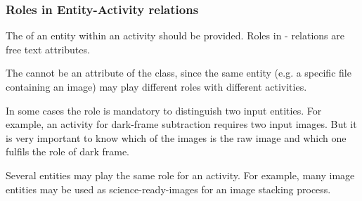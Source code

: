 \subsubsection{Roles in Entity-Activity relations}
\label{sec:roles}

The  of an entity within an activity should be provided. 
Roles in - relations are free text attributes.

The  cannot be an attribute of the  class, since the same entity (e.g. a specific file containing an image) may play different roles with different activities. 

In some cases the role is mandatory to distinguish two input entities. For example, an activity for dark-frame subtraction requires two input images. But it is very important to know which of the images is the raw image and which one fulfils the role of dark frame.

Several entities may play the same role for an activity. For example, many image entities may be used as science-ready-images for an image stacking process. 









